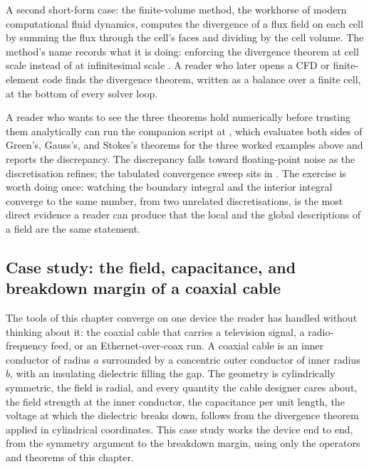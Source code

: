 A second short-form case: the finite-volume method, the workhorse of
modern computational fluid dynamics, computes the divergence of a
flux field on each cell by summing the flux through the cell's faces
and dividing by the cell volume. The method's name records what it is
doing: enforcing the divergence theorem at cell scale instead of at
infinitesimal scale \cite{text:v2ch08-marsden-tromba-2012}. A reader
who later opens a CFD or finite-element code finds the divergence
theorem, written as a balance over a finite cell, at the bottom of
every solver loop.

A reader who wants to see the three theorems hold numerically before
trusting them analytically can run the companion script at
,
which evaluates both sides of Green's, Gauss's, and Stokes's theorems
for the three worked examples above and reports the discrepancy. The
discrepancy falls toward floating-point noise as the discretisation
refines; the tabulated convergence sweep sits in
. The exercise is worth doing
once: watching the boundary integral and the interior integral
converge to the same number, from two unrelated discretisations, is
the most direct evidence a reader can produce that the local and the
global descriptions of a field are the same statement.

\subsection{Case study: the field, capacitance, and breakdown margin
of a coaxial cable}

The tools of this chapter converge on one device the reader has
handled without thinking about it: the coaxial cable that carries a
television signal, a radio-frequency feed, or an Ethernet-over-coax
run. A coaxial cable is an inner conductor of radius $a$ surrounded by
a concentric outer conductor of inner radius $b$, with an insulating
dielectric filling the gap. The geometry is cylindrically symmetric,
the field is radial, and every quantity the cable designer cares
about, the field strength at the inner conductor, the capacitance per
unit length, the voltage at which the dielectric breaks down, follows
from the divergence theorem applied in cylindrical coordinates. This
case study works the device end to end, from the symmetry argument to
the breakdown margin, using only the operators and theorems of this
chapter.


